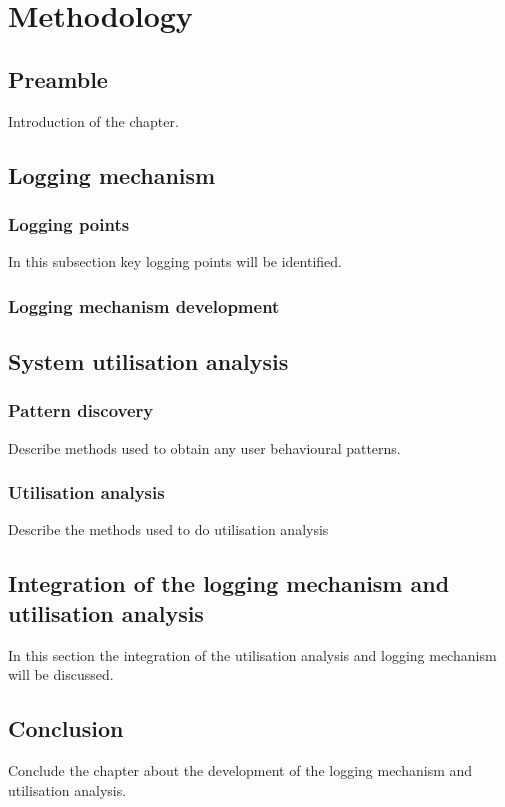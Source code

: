 \chapter{Methodology}
\label{chap:2}

\section{Preamble}
Introduction of the chapter.

\section{Logging mechanism}

\subsection{Logging points}
In this subsection key logging points will be identified.

\subsection{Logging mechanism development}

\section{System utilisation analysis}

\subsection{Pattern discovery}
Describe methods used to obtain any user behavioural patterns.

\subsection{Utilisation analysis}
Describe the methods used to do utilisation analysis

\section{Integration of the logging mechanism and utilisation analysis}
In this section the integration of the utilisation analysis and logging mechanism will be discussed.

\section{Conclusion}
Conclude the chapter about the development of the logging mechanism and utilisation analysis.